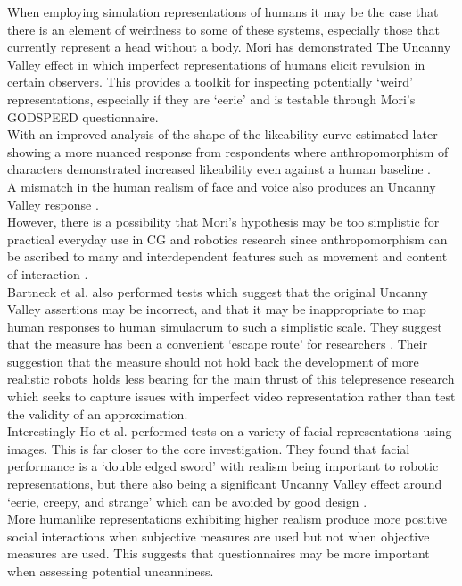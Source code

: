When employing simulation representations of humans it may be the case that there is an element of weirdness to some of these systems, especially those that currently represent a head without a body. Mori has demonstrated The Uncanny Valley \cite{Mori1970} effect in which imperfect representations of humans elicit revulsion in certain observers. This provides a toolkit for inspecting potentially `weird' representations, especially if they are `eerie' and is testable through Mori's GODSPEED questionnaire. \\
                    With an improved analysis of the shape of the likeability curve estimated later showing a more nuanced response from respondents where anthropomorphism of characters demonstrated increased likeability even against a human baseline \cite{Bartneck2007, Bartneck2009a}.\\
                    A mismatch in the human realism of face and voice also produces an Uncanny Valley response \cite{Mitchell2011}.\\
                    However, there is a possibility that Mori's hypothesis may be too simplistic for practical everyday use in CG and robotics research since anthropomorphism can be ascribed to many and interdependent features such as movement and content of interaction \cite{Bartneck2009}.\\
                    Bartneck et al. also performed tests which suggest that the original Uncanny Valley assertions may be incorrect, and that it may be inappropriate to map human responses to human simulacrum to such a simplistic scale. They suggest that the measure has been a convenient `escape route' for researchers \cite{Bartneck2009}. Their suggestion that the measure should not hold back the development of more realistic robots holds less bearing for the main thrust of this telepresence research which seeks to capture issues with imperfect video representation rather than test the validity of an approximation.\\
                    Interestingly Ho et al. performed tests on a variety of facial representations using images. This is far closer to the core investigation. They found that facial performance is a `double edged sword' with realism being important to robotic representations, but there also being a significant Uncanny Valley effect around `eerie, creepy, and strange' which can be avoided by good design \cite{Ho2008}.\\
                    More humanlike representations exhibiting higher realism produce more positive social interactions when subjective measures are used \cite{Yee2007a} but not when objective measures are used. This suggests that questionnaires may be more important when assessing potential uncanniness.\\
